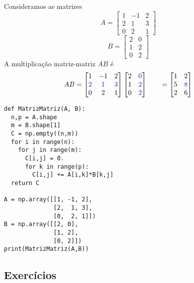 \begin{ex}
  Consideramos as matrizes
  \begin{equation}
    A =
    \begin{bmatrix}
      1 & -1 & 2\\
      2 & 1 & 3\\
      0 & 2 & 1
    \end{bmatrix}
  \end{equation}
  \begin{equation}
    B =
    \begin{bmatrix}
      2 & 0\\
      1 & 2\\
      0 & 2
    \end{bmatrix}
  \end{equation}
  A multiplicação matriz-matriz $AB$ é
  \begin{align}
    & AB = \begin{bmatrix}
    1 & -1 & 2\\
    \color{blue}2 & \color{blue}1 & \color{blue}3\\
    0 & 2 & 1
  \end{bmatrix}\begin{bmatrix}
    2 & \color{blue}0\\
    1 & \color{blue}2\\
    0 & \color{blue}2
  \end{bmatrix}
  & \text{}\quad =
        \begin{bmatrix}
          1 & 2\\
          5 & \color{blue}8\\
          2 & 6
        \end{bmatrix}
  \end{align}

\begin{lstlisting}
def MatrizMatriz(A, B):
  n,p = A.shape
  m = B.shape[1]
  C = np.empty((n,m))
  for i in range(n):
    for j in range(m):
      C[i,j] = 0.
      for k in range(p):
        C[i,j] += A[i,k]*B[k,j]
  return C

A = np.array([[1, -1, 2],
              [2,  1, 3],
              [0,  2, 1]])
B = np.array([[2, 0],
              [1, 2],
              [0, 2]])
print(MatrizMatriz(A,B))
\end{lstlisting}

\end{ex}

\subsection{Exercícios}

